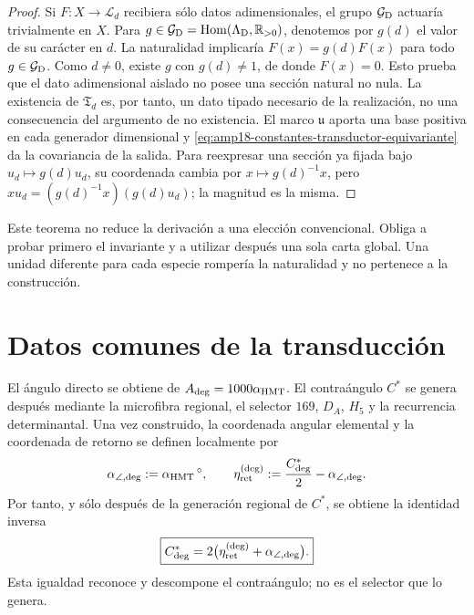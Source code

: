\begin{proof}
Si \(F:X\to\mathcal L_d\) recibiera sólo datos adimensionales, el grupo
\(\mathcal G_{\rm D}\) actuaría trivialmente en \(X\). Para
\(g\in\mathcal G_{\rm D}=\operatorname{Hom}(\Lambda_{\rm D},
\mathbb R_{>0})\), denotemos por \(g(d)\) el valor de su carácter en
\(d\). La naturalidad implicaría \(F(x)=g(d)F(x)\) para todo
\(g\in\mathcal G_{\rm D}\). Como \(d\neq0\), existe \(g\) con
\(g(d)\neq1\), de donde \(F(x)=0\).
Esto prueba que el dato adimensional aislado no posee una sección natural
no nula. La existencia de \(\mathfrak T_d\) es, por tanto, un dato tipado necesario
de la realización, no una consecuencia del argumento de no existencia. El
marco \(\mathfrak u\) aporta una base positiva en cada generador dimensional
y \eqref{eq:amp18-constantes-transductor-equivariante} da la covariancia de
la salida. Para reexpresar una sección ya fijada bajo
\(u_d\mapsto g(d)u_d\), su coordenada cambia por
\(x\mapsto g(d)^{-1}x\), pero
\(xu_d=(g(d)^{-1}x)(g(d)u_d)\); la magnitud es la misma.
\end{proof}

Este teorema no reduce la derivación a una elección convencional. Obliga a
probar primero el invariante y a utilizar después una sola carta global. Una
unidad diferente para cada especie rompería la naturalidad y no pertenece a
la construcción.

\section{Datos comunes de la transducción}

El ángulo directo se obtiene de
\(A_{\rm deg}=1000\alpha_{\rm HMT}\). El contraángulo \(C^*\) se genera
después mediante la microfibra regional, el selector \(169\), \(D_A\),
\(H_5\) y la recurrencia determinantal. Una vez construido, la coordenada
angular elemental y la coordenada de retorno se definen localmente por
\begin{equation}
 \label{eq:amp18-constantes-alpha-angular-eta-retorno}
 \alpha_{\angle,\rm deg}:=\alpha_{\rm HMT}\,{}^\circ,
 \qquad
 \eta_{\rm ret}^{(\rm deg)}
 :=\frac{C^*_{\rm deg}}2-\alpha_{\angle,\rm deg}.
\end{equation}
Por tanto, y sólo después de la generación regional de \(C^*\), se obtiene
la identidad inversa
\begin{equation}
 \label{eq:amp18-constantes-contraangulo-inverso}
 \boxed{
 C^*_{\rm deg}
 =2\bigl(\eta_{\rm ret}^{(\rm deg)}+\alpha_{\angle,\rm deg}\bigr).}
\end{equation}
Esta igualdad reconoce y descompone el contraángulo; no es el selector que
lo genera.

